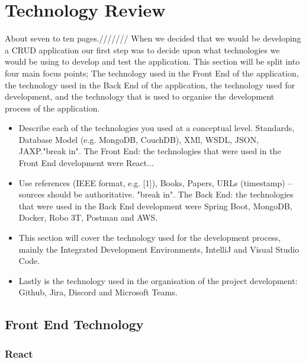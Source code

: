 

\chapter{Technology Review}

About seven to ten pages.///////
 When we decided that we would be developing a CRUD application our first step was to decide upon what technologies we would be using to develop and test the application. This section will be split into four main focus points; The technology used in the Front End of the application, the technology used in the Back End of the application, the technology used for development, and the technology that is used to organise the development process of the application.
\begin{itemize}
\item Describe each of the technologies you used at a conceptual level. Standards, Database Model (e.g. MongoDB, CouchDB), XMl, WSDL, JSON, JAXP."break in". The Front End: the technologies that were used in the Front End development were React...
\item Use references (IEEE format, e.g. [1]), Books, Papers, URLs (timestamp) – sources should be authoritative. "break in". The Back End: the technologies that were used in the Back End development were Spring Boot, MongoDB, Docker, Robo 3T, Postman and AWS.
\item This section will cover the technology used for the development process, mainly the Integrated Development Environments, IntelliJ and Visual Studio Code.
\item Lastly is the technology used in the organisation of the project development: Github, Jira, Discord and Microsoft Teams.
\end{itemize}

\section{Front End Technology}
\subsection{React}


